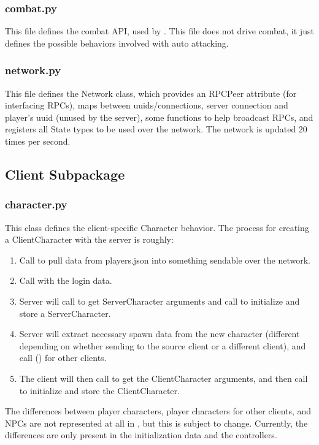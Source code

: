 \documentclass{article}
\begin{document}
\subsubsection{combat.py}
This file defines the combat API, used by . This file does not
drive combat, it just defines the possible behaviors involved with auto attacking.

\subsubsection{network.py}
This file defines the Network class, which provides an RPCPeer attribute (for interfacing
RPCs), maps between uuids/connections, server connection and player's uuid (unused by
the server), some functions to help broadcast RPCs, and registers all State types to
be used over the network. The network is updated 20 times per second.

\subsection{Client Subpackage}
\subsubsection{character.py}
This class defines the client-specific Character behavior. The process for creating a
ClientCharacter with the server is roughly:
\begin{enumerate}
    \item Call  to pull data from players.json into something
        sendable over the network.
    \item Call  with the login data.
    \item Server will call  to get ServerCharacter
        arguments and call  to initialize and store a ServerCharacter.
    \item Server will extract necessary spawn data from the new character (different
        depending on whether sending to the source client or a different client), and call
         () for other
        clients.
    \item The client will then call  to get the
        ClientCharacter arguments, and then call  to initialize
        and store the ClientCharacter.
\end{enumerate}
The differences between player characters, player characters for other clients, and NPCs
are not represented at all in , but this is subject to change.
Currently, the differences are only present in the initialization data and the controllers.
\end{document}
